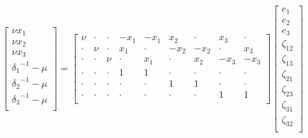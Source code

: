 \begin{equation}
\left[\begin{array}{c}
	       \nu x_1        \\
	       \nu x_2        \\
	       \nu x_3        \\
	{\delta_1}^{-1} - \mu \\
	{\delta_2}^{-1} - \mu \\
	{\delta_3}^{-1} - \mu \\
\end{array}\right]
=
\left[\begin{array}{ccccccccc}
	 \nu  & \cdot & \cdot & -x_1  & -x_1  &  x_2  & \cdot &  x_3  & \cdot \\
	\cdot &  \nu  & \cdot &  x_1  & \cdot & -x_2  & -x_2  & \cdot &  x_3  \\
	\cdot & \cdot &  \nu  & \cdot &  x_1  & \cdot &  x_2  & -x_3  & -x_3  \\
	\cdot & \cdot & \cdot &   1   &   1   & \cdot & \cdot & \cdot & \cdot \\
	\cdot & \cdot & \cdot & \cdot & \cdot &   1   &   1   & \cdot & \cdot \\
	\cdot & \cdot & \cdot & \cdot & \cdot & \cdot & \cdot &   1   &   1   \\
\end{array}\right]
\left[\begin{array}{c}
	   e_1     \\
	   e_2     \\
	   e_3     \\
	\zeta_{12} \\
	\zeta_{13} \\
	\zeta_{21} \\
	\zeta_{23} \\
	\zeta_{31} \\
	\zeta_{32} \\
\end{array}\right]
\end{equation}